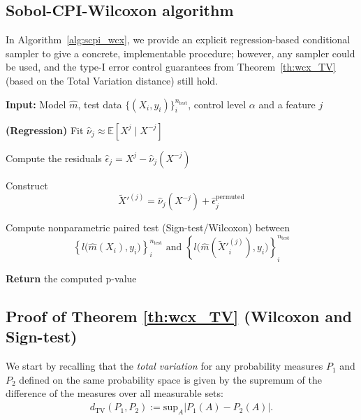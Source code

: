 \documentclass{article}
\theoremstyle{plain}
\theoremstyle{definition}
\theoremstyle{remark}
\begin{document}
\subsection{Sobol-CPI-Wilcoxon algorithm}

In Algorithm~\ref{alg:scpi_wcx}, we provide an explicit regression-based conditional sampler to give a concrete, implementable procedure; however, any sampler could be used, and the type-I error control guarantees from Theorem~\ref{th:wcx_TV} (based on the Total Variation distance) still hold.

\begin{algorithm}[H]
\caption{Nonparametric Sobol-CPI (\texttt{Sobol-CPI-ST/Wilcox})}
\label{alg:scpi_wcx}
\begin{algorithmic}[1]
\item[] \textbf{Input:} Model $\widehat{m}$, test data $\{(X_i,y_i)\}_i^{n_{\mathrm{test}}}$, control level $\alpha$ and a feature $j$
    \item[] \quad \textbf{(Regression)} Fit $\widehat{\nu}_j \approx \mathbb{E}[X^j \mid X^{-j}]$
    \item[] Compute the residuals $\widehat{\epsilon}_{j} = X^j -\widehat{\nu}_j(X^{-j})$
    \item[] Construct 
    \[
        \widetilde{X}'^{(j)}
        = \widehat{\nu}_j(X^{-j})
        + \widehat{\epsilon}_{j}^\mathrm{permuted}
    \]
    \item[] Compute nonparametric paired test (Sign-test/Wilcoxon) between %
    \[
        \left\{l\bigl(\widehat{m}(X_{i}), y_i\bigr)\right\}_i^{n_\mathrm{test}}
        \text{ and }
        \left\{l\bigl(\widehat{m}(\widetilde{X}'^{(j)}_{i}), y_i\bigr)\right\}_i^{n_\mathrm{test}}
    \]
\item[] \textbf{Return} the computed p-value
\end{algorithmic}
\label{alg:SCPI_wcx}
\end{algorithm}


\subsection{Proof of Theorem \ref{th:wcx_TV} (Wilcoxon and Sign-test)}


We start by recalling that the \emph{total variation} for any probability measures $P_1$ and $P_2$ defined on the same probability space is given by the supremum of the difference of the measures over all measurable sets:
\begin{align*}
    d_\mathrm{TV}(P_1, P_2):=\mathrm{sup}_A |P_1(A)-P_2(A)|.
\end{align*}
\end{document}
